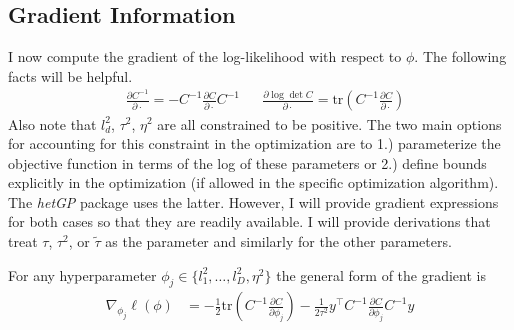\documentclass[12pt]{article}
\begin{document}
\subsection{Gradient Information}
I now compute the gradient of the log-likelihood with respect to $\phi$. The following facts will be helpful. 
\begin{align*}
&\frac{\partial C^{-1}}{\partial \cdot} = -C^{-1} \frac{\partial C}{\partial \cdot} C^{-1} && \frac{\partial \log\det C}{\partial \cdot} = \text{tr}\left(C^{-1} \frac{\partial C}{\partial \cdot} \right)
\end{align*}
Also note that $l_d^2$, $\tau^2$, $\eta^2$ are all constrained to be positive. 
The two main options for accounting for this constraint in the optimization are to 1.) parameterize the 
objective function in terms of the log of these parameters or 2.) define bounds explicitly in the optimization (if allowed in the specific optimization algorithm). The \textit{hetGP} package 
uses the latter. However, I will provide gradient expressions for both cases so that they are readily available.  
I will provide derivations that treat $\tau$, $\tau^2$, or $\tilde{\tau}$ as the parameter and similarly for the other parameters. 

For any hyperparameter $\phi_j \in \{l^2_1, \dots, l^2_D, \eta^2 \}$ the general form of the gradient is 
\begin{align*}
\nabla_{\phi_j} \ell(\phi) &= -\frac{1}{2} \text{tr}\left(C^{-1} \frac{\partial C}{\partial \phi_j} \right) - \frac{1}{2\tau^2} y^\top C^{-1} \frac{\partial C}{\partial \phi_j} C^{-1} y
\end{align*}
\end{document}
